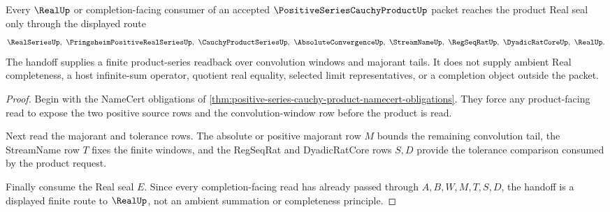 \begin{theorem}
\label{thm:positive-series-cauchy-product-real-seal-handoff}
Every $\RealUp$ or completion-facing consumer of an accepted $\PositiveSeriesCauchyProductUp$ packet reaches the product Real seal only through the displayed route
$$
\RealSeriesUp,\ \PringsheimPositiveRealSeriesUp,\ \CauchyProductSeriesUp,\ \AbsoluteConvergenceUp,\ \StreamNameUp,\ \RegSeqRatUp,\ \DyadicRatCoreUp,\ \RealUp .
$$
The handoff supplies a finite product-series readback over convolution windows and majorant tails. It does not supply ambient Real completeness, a host infinite-sum operator, quotient real equality, selected limit representatives, or a completion object outside the packet.
\end{theorem}
\begin{proof}
Begin with the NameCert obligations of \autoref{thm:positive-series-cauchy-product-namecert-obligations}. They force any product-facing read to expose the two positive source rows and the convolution-window row before the product is read.

Next read the majorant and tolerance rows. The absolute or positive majorant row $M$ bounds the remaining convolution tail, the StreamName row $T$ fixes the finite windows, and the RegSeqRat and DyadicRatCore rows $S,D$ provide the tolerance comparison consumed by the product request.

Finally consume the Real seal $E$. Since every completion-facing read has already passed through $A,B,W,M,T,S,D$, the handoff is a displayed finite route to $\RealUp$, not an ambient summation or completeness principle.
\end{proof}


\begin{closurestatus}{\PositiveSeriesCauchyProductUp}
  \theoryclosure{\seedClosure}
  \formalstatus{\unformalizedV}
\end{closurestatus}
